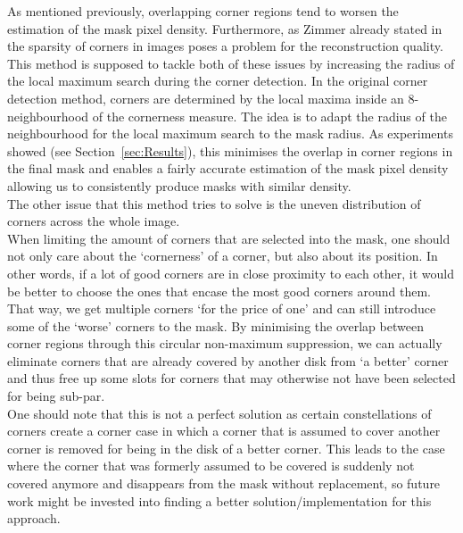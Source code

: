 As mentioned previously, overlapping corner regions tend to worsen the estimation of the mask pixel
density. 
Furthermore, as Zimmer already stated in~\cite{zimmer07} the sparsity of corners in images poses a
problem for the reconstruction quality. This method is supposed to tackle both of these issues by
increasing the radius of the local maximum search during the corner detection. In the original
corner detection method, corners are determined by the local maxima inside an 
8-neighbourhood of the cornerness measure. The idea is to adapt the radius of the neighbourhood for the
local maximum search to the mask radius. As experiments showed (see Section~\ref{sec:Results}), this minimises the overlap in
corner regions in the final mask and enables a fairly accurate estimation of the mask pixel
density allowing us to consistently produce masks with similar density. \\
The other issue that this method tries to solve is the uneven distribution of corners across
the whole image. \\
When limiting the amount of corners that are selected into the mask, one should not only care about
the `cornerness' of a corner, but also about its position. In other words, if a lot of good corners
are in close proximity to each other, it would be better to choose the ones that encase the most
good corners around them. That way, we get multiple corners `for the price of one' and can still
introduce some of the `worse' corners to the mask.
By minimising the overlap between corner regions through this circular non-maximum suppression, we
can actually eliminate corners that are already covered by another disk from `a better' corner and
thus free up some slots for corners that may otherwise not have been selected for being sub-par.\\
One should note that this is not a perfect solution as certain constellations of corners create
a corner case in which a corner that is assumed to cover another corner is removed for being in the
disk of a better corner. This leads to the case where the corner that was formerly assumed to be
covered is suddenly not covered anymore and disappears from the mask without replacement, so future
work might be invested into finding a better solution/implementation for this approach.

